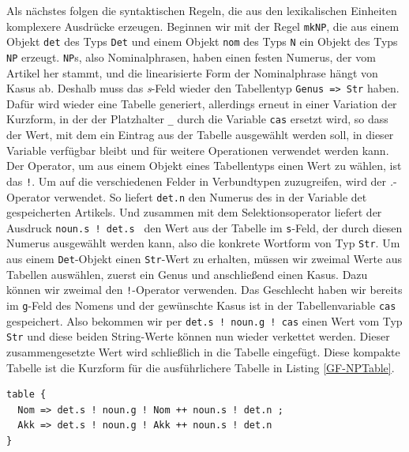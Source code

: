 Als nächstes folgen die syntaktischen Regeln, die aus den lexikalischen Einheiten komplexere Ausdrücke erzeugen. Beginnen wir mit der Regel \texttt{mkNP}, die aus einem Objekt \texttt{det} des Typs \texttt{Det} und einem Objekt \texttt{nom} des Typs \texttt{N} ein Objekt des Typs \texttt{NP} erzeugt. \texttt{NP}s, also Nominalphrasen, haben einen festen Numerus, der vom Artikel her stammt, und die linearisierte Form der Nominalphrase hängt von Kasus ab. Deshalb muss das \textit{s}-Feld wieder den Tabellentyp \texttt{Genus => Str} haben. Dafür wird wieder eine Tabelle generiert, allerdings erneut in einer Variation der Kurzform, in der der Platzhalter \texttt{\_} durch die Variable \texttt{cas} ersetzt wird, so dass der Wert, mit dem ein Eintrag aus der Tabelle ausgewählt werden soll, in dieser Variable verfügbar bleibt und für weitere Operationen verwendet werden kann. Der Operator, um aus einem Objekt eines Tabellentyps einen Wert zu wählen, ist das \texttt{!}. Um auf die verschiedenen Felder in Verbundtypen zuzugreifen, wird der \textit{.}-Operator verwendet. So liefert \texttt{det.n} den Numerus des in der Variable det gespeicherten Artikels. Und zusammen mit dem Selektionsoperator liefert der Ausdruck \texttt{noun.s ! det.s } den Wert aus der Tabelle im \texttt{s}-Feld, der durch diesen Numerus ausgewählt werden kann, also die konkrete Wortform von Typ \texttt{Str}. Um aus einem \texttt{Det}-Objekt einen \texttt{Str}-Wert zu erhalten, müssen wir zweimal Werte aus Tabellen auswählen, zuerst ein Genus und anschließend einen Kasus. Dazu können wir zweimal den \texttt{!}-Operator verwenden. Das Geschlecht haben wir bereits im \texttt{g}-Feld des Nomens und der gewünschte Kasus ist in der Tabellenvariable \texttt{cas} gespeichert. Also bekommen wir per \texttt{det.s ! noun.g ! cas} einen Wert vom Typ \texttt{Str} und diese beiden String-Werte können nun wieder verkettet werden. Dieser zusammengesetzte Wert wird schließlich in die Tabelle eingefügt. Diese kompakte Tabelle ist die Kurzform für die ausführlichere Tabelle in Listing \ref{GF-NPTable}. \par
\begin{lstlisting}[float=ht,caption={Ausführliche Form der Tabelle in Zeile 13 des Listings \ref{GF-SatzGer}},label={GF-NPTable}]
table { 
  Nom => det.s ! noun.g ! Nom ++ noun.s ! det.n ; 
  Akk => det.s ! noun.g ! Akk ++ noun.s ! det.n 
}
\end{lstlisting}
